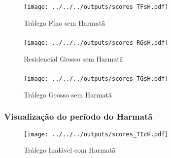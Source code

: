 \begin{frame}
  \frametitle{}
    
\end{frame}

\begin{frame}
  \frametitle{}
  \begin{figure}[H]
   \centering
    \caption{Tráfego Fino sem Harmatã}
    \texttt{[image: ../../../outputs/scores\_TFsH.pdf]}
  \end{figure}
\end{frame}


\begin{frame}
  \frametitle{}
    
\end{frame}

\begin{frame}
  \frametitle{}
  \begin{figure}[H]
   \centering
    \caption{Residencial Grosso sem Harmatã}
    \texttt{[image: ../../../outputs/scores\_RGsH.pdf]}
  \end{figure}
\end{frame}

\begin{frame}
  \frametitle{}
    
\end{frame}

\begin{frame}
  \frametitle{}
  \begin{figure}[H]
   \centering
    \caption{Tráfego Grosso sem Harmatã}
    \texttt{[image: ../../../outputs/scores\_TGsH.pdf]}
  \end{figure}
\end{frame}

\begin{frame}
  \frametitle{Visualização do período do Harmatã}
  \begin{figure}[H]
   \centering
    \caption{Tráfego Inalável com Harmatã}
    \texttt{[image: ../../../outputs/scores\_TIcH.pdf]}
  \end{figure}
\end{frame}
